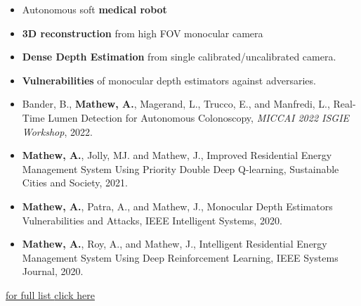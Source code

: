 \documentclass[10pt,a4paper,ragged2e, normalphoto]{altacv}
\begin{document}

\begin{itemize}
	\item Autonomous soft \textbf{medical robot}
	\item \textbf{3D reconstruction} from high FOV monocular camera
\end{itemize}

\divider


\begin{itemize}
	\item \textbf{Dense Depth Estimation} from single calibrated/uncalibrated camera.
	\item \textbf{Vulnerabilities} of monocular depth estimators against adversaries.
\end{itemize}



\begin{itemize}
	\item  Bander, B., {\color{IFLightBlue} \textbf{Mathew, A.}}, Magerand, L., Trucco, E., and Manfredi, L., Real-Time Lumen Detection for Autonomous Colonoscopy, \textit{MICCAI 2022 ISGIE Workshop}, 2022.
	\item {\color{IFLightBlue} \textbf{Mathew, A.}}, Jolly, MJ. and Mathew, J., Improved Residential Energy Management System Using Priority Double Deep Q-learning, Sustainable Cities and Society, 2021.
	\item {\color{IFLightBlue} \textbf{Mathew, A.}}, Patra, A., and Mathew, J., Monocular Depth Estimators Vulnerabilities and Attacks, IEEE Intelligent Systems, 2020.
	\item {\color{IFLightBlue} \textbf{Mathew, A.}}, Roy, A., and Mathew, J., Intelligent Residential Energy Management System Using Deep Reinforcement Learning, IEEE Systems Journal, 2020.
\end{itemize}

\hfill \href{https://alwynm.github.io/pub}{for full list {\color{IFLightBlue}click here}}
\end{document}
